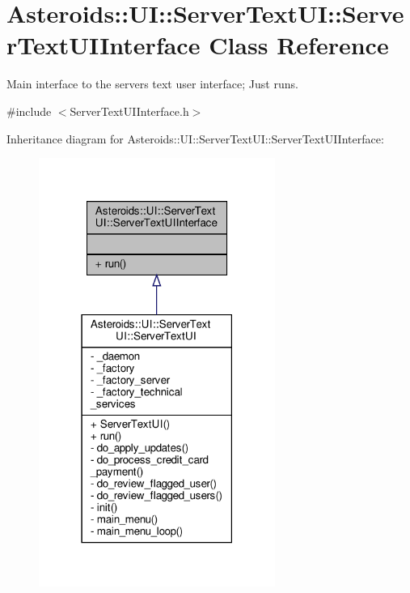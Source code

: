 \hypertarget{classAsteroids_1_1UI_1_1ServerTextUI_1_1ServerTextUIInterface}{}\section{Asteroids\+:\+:UI\+:\+:Server\+Text\+UI\+:\+:Server\+Text\+U\+I\+Interface Class Reference}
\label{classAsteroids_1_1UI_1_1ServerTextUI_1_1ServerTextUIInterface}


Main interface to the server\textquotesingle{}s text user interface; Just runs.  




{\ttfamily \#include $<$Server\+Text\+U\+I\+Interface.\+h$>$}



Inheritance diagram for Asteroids\+:\+:UI\+:\+:Server\+Text\+UI\+:\+:Server\+Text\+U\+I\+Interface\+:\nopagebreak
\begin{figure}[H]
\begin{center}
\leavevmode
\includegraphics[width=219pt]{classAsteroids_1_1UI_1_1ServerTextUI_1_1ServerTextUIInterface__inherit__graph}
\end{center}
\end{figure}


